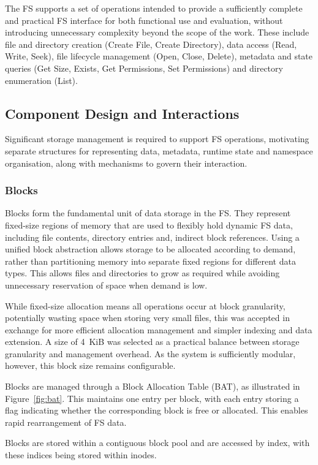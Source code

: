 The FS supports a set of operations intended to provide a sufficiently complete and practical FS interface for both functional use and evaluation, without introducing unnecessary complexity beyond the scope of the work. These include file and directory creation (Create File, Create Directory), data access (Read, Write, Seek), file lifecycle management (Open, Close, Delete), metadata and state queries (Get Size, Exists, Get Permissions, Set Permissions) and directory enumeration (List).
\newpage
\subsection{Component Design and Interactions}

Significant storage management is required to support FS operations, motivating separate structures for representing data, metadata, runtime state and namespace organisation, along with mechanisms to govern their interaction. 

\subsubsection{Blocks}

Blocks form the fundamental unit of data storage in the FS. They represent fixed-size regions of memory that are used to flexibly hold dynamic FS data, including file contents, directory entries and, indirect block references. Using a unified block abstraction allows storage to be allocated according to demand, rather than partitioning memory into separate fixed regions for different data types. This allows files and directories to grow as required while avoiding unnecessary reservation of space when demand is low.

While fixed-size allocation means all operations occur at block granularity, potentially wasting space when storing very small files, this was accepted in exchange for more efficient allocation management and simpler indexing and data extension. A size of 4~KiB was selected as a practical balance between storage granularity and management overhead. As the system is sufficiently modular, however, this block size remains configurable.

Blocks are managed through a Block Allocation Table (BAT), as illustrated in Figure~\ref{fig:bat}. This maintains one entry per block, with each entry storing a flag indicating whether the corresponding block is free or allocated. This enables rapid rearrangement of FS data.

Blocks are stored within a contiguous block pool and are accessed by index, with these indices being stored within inodes.

